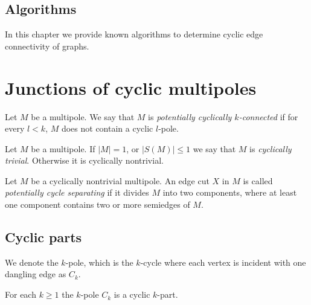\documentclass[12pt, twoside]{book}
\begin{document}
\section{Algorithms}\label{sec:algorithms}

In this chapter we provide known algorithms to determine cyclic edge connectivity of graphs.

\chapter{Junctions of cyclic multipoles}

\begin{definition}
	Let $M$ be a multipole. We say that $M$ is \textit{potentially cyclically $k$-connected} if for every $l < k$, $M$ does not contain a cyclic $l$-pole.
\end{definition}

\begin{definition}
	Let $M$ be a multipole. If $|M|=1$, or $|S(M)|\leq 1$ we say that $M$ is \textit{cyclically trivial}. Otherwise it is cyclically nontrivial. 
\end{definition}

\begin{definition}
	Let $M$ be a cyclically nontrivial multipole. An edge cut $X$ in $M$ is called \textit{potentially cycle separating} if it divides $M$ into two components, where at least one component contains two or more semiedges of $M$.
\end{definition}

\section{Cyclic parts}\label{sec:cyclic-part-results}

We denote the $k$-pole, which is the $k$-cycle where each vertex is incident with one dangling edge as $C_k$.

\begin{lemma}\label{lem:each-cycle-cyclic-part}
	For each $k\geq 1$ the $k$-pole $C_k$ is a cyclic $k$-part. 
\end{lemma}
\end{document}
